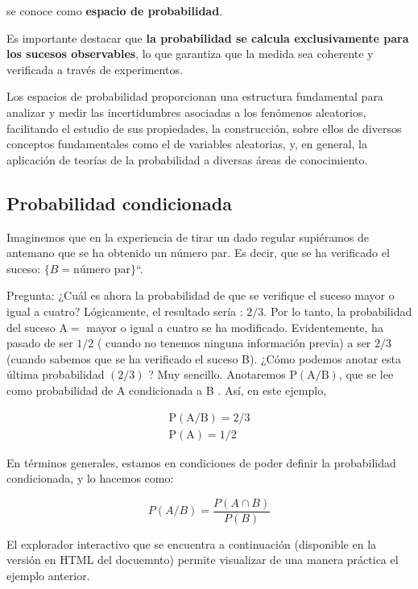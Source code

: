 \documentclass[
]{article}
\begin{document}
se conoce como \textbf{espacio de probabilidad}.

Es importante destacar que \textbf{la probabilidad se calcula exclusivamente para los sucesos observables}, lo que garantiza que la medida sea coherente y verificada a través de experimentos.

Los espacios de probabilidad proporcionan una estructura fundamental para analizar y medir las incertidumbres asociadas a los fenómenos aleatorios, facilitando el estudio de sus propiedades, la construcción, sobre ellos de diversos conceptos fundamentales como el de variables aleatorias, y, en general, la aplicación de teorías de la probabilidad a diversas áreas de conocimiento.

\subsection{Probabilidad condicionada}\label{probabilidad-condicionada}

Imaginemos que en la experiencia de tirar un dado regular supiéramos de
antemano que se ha obtenido un número par. Es decir, que se ha
verificado el suceso: \(\{B = \mbox{número par}\}\)``.

Pregunta: ¿Cuál es ahora la probabilidad de que se verifique el suceso
mayor o igual a cuatro? Lógicamente, el resultado sería : \(2 / 3\). Por
lo tanto, la probabilidad del suceso \(\mathrm{A}=\) mayor o igual a
cuatro se ha modificado. Evidentemente, ha pasado de ser \(1 / 2\) (
cuando no tenemos ninguna información previa) a ser \(2 / 3\) (cuando
sabemos que se ha verificado el suceso B). ¿Cómo podemos anotar esta
última probabilidad \((2 / 3)\) ? Muy sencillo. Anotaremos
\(\mathrm{P}(\mathrm{A} / \mathrm{B})\), que se lee como probabilidad de A
condicionada a B . Así, en este ejemplo,

\[
\begin{gathered}
\mathrm{P}(\mathrm{A} / \mathrm{B})=2 / 3 \\
\mathrm{P}(\mathrm{A})=1 / 2
\end{gathered}
\]

En términos generales, estamos en condiciones de poder definir la
probabilidad condicionada, y lo hacemos como:

\[
P(A / B)=\frac{P(A \cap B)}{P(B)}
\]

El explorador interactivo que se encuentra a continuación (disponible en la versión en HTML del docuemnto) permite visualizar de una manera práctica el ejemplo
anterior.
\end{document}
